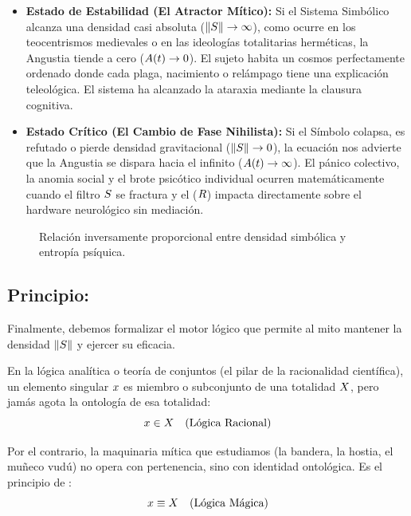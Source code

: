 \begin{itemize}
    \item \textbf{Estado de Estabilidad (El Atractor Mítico):} Si el Sistema Simbólico alcanza una densidad casi absoluta ($\|S\| \to \infty$), como ocurre en los teocentrismos medievales o en las ideologías totalitarias herméticas, la Angustia tiende a cero ($A(t) \to 0$). El sujeto habita un cosmos perfectamente ordenado donde cada plaga, nacimiento o relámpago tiene una explicación teleológica. El sistema ha alcanzado la ataraxia mediante la clausura cognitiva.
    \item \textbf{Estado Crítico (El Cambio de Fase Nihilista):} Si el Símbolo colapsa, es refutado o pierde densidad gravitacional ($\|S\| \to 0$), la ecuación nos advierte que la Angustia se dispara hacia el infinito ($A(t) \to \infty$). El pánico colectivo, la anomia social y el brote psicótico individual ocurren matemáticamente cuando el filtro $S$ se fractura y el \AbsolutismoRealidad{} ($R$) impacta directamente sobre el hardware neurológico sin mediación.
\end{itemize}

\begin{figure}[htbp]
    \centering
    
    \caption{Relación inversamente proporcional entre densidad simbólica y entropía psíquica.}
    \label{fig:termodinamica_angustia}
\end{figure}

\subsection{Principio: \ParsProToto}

Finalmente, debemos formalizar el motor lógico que permite al mito mantener la densidad $\|S\|$ y ejercer su eficacia. 

En la lógica analítica o teoría de conjuntos (el pilar de la racionalidad científica), un elemento singular $x$ es miembro o subconjunto de una totalidad $X$, pero jamás agota la ontología de esa totalidad:
\begin{equation}
    x \in X \quad (\text{Lógica Racional})
\end{equation}

Por el contrario, la maquinaria mítica que estudiamos (la bandera, la hostia, el muñeco vudú) no opera con pertenencia, sino con identidad ontológica. Es el principio de \textbf{\ParsProToto}:
\begin{equation}
    x \equiv X \quad (\text{Lógica Mágica})
\end{equation}

